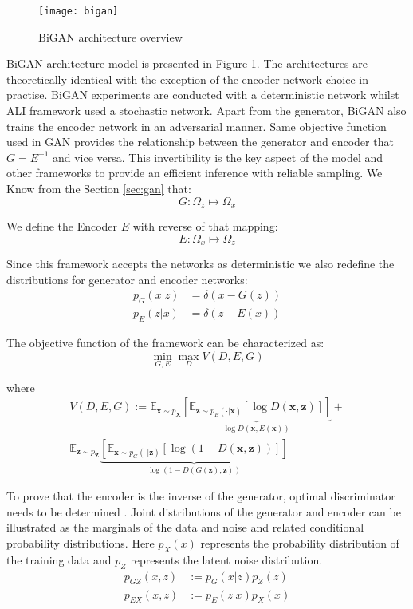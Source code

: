 \begin{figure}[h!]
	\centering
	\texttt{[image: bigan]}
    \caption{BiGAN architecture overview}
    \label{fig:bigan_model}
\end{figure}


BiGAN architecture model is presented in Figure \ref{fig:bigan_model}. The architectures are
theoretically identical with the exception of the encoder network choice in practise. BiGAN
experiments are conducted with a deterministic network whilst ALI framework used a stochastic
network. Apart from the generator, BiGAN also trains the encoder network in an adversarial manner.
Same objective function used in GAN provides the relationship between the generator and encoder that
$G = E^{-1}$ and vice versa. This invertibility is the key aspect of the model and other
frameworks to provide an efficient inference with reliable sampling. We Know from the Section
\ref{sec:gan} that: 
$$
G : \Omega_{z} \mapsto \Omega_{x}
$$

We define the Encoder $E$ with reverse of that mapping:
$$
E : \Omega_{x} \mapsto \Omega_{z}
$$

Since this framework accepts the networks as deterministic we also redefine the distributions for
generator and encoder networks:
\begin{align*}
    p_G(x | z) & = \delta (x - G(z)) \\
    p_E(z | x) & = \delta (z - E(x))
\end{align*}

The objective function of the framework can be characterized as:
\begin{equation}
    \min _{G, E} \max _{D} V(D, E, G)
\end{equation}
 
where
\begin{multline}
    \label{eqn:bigan_v}
V(D, E, G) :=\mathbb{E}_{\mathbf{x} \sim p_{\mathbf{X}}}  \underbrace{\left[ \mathbb{E}_{\mathbf{z} \sim p_{E}(\cdot | \mathbf{x})}[\log D(\mathbf{x}, \mathbf{z})] \right]}_{\log D(\mathbf{x}, E(\mathbf{x}))} + \\ \mathbb{E}_{\mathbf{z} \sim p_{\mathbf{Z}}} \underbrace{  \left[ \mathbb{E}_{\mathbf{x} \sim p_{G}(\cdot | \mathbf{z})}[\log (1-D(\mathbf{x}, \mathbf{z}))] \right]}_{\log (1-D(G(\mathbf{z}), \mathbf{z}))}
\end{multline}

To prove that the encoder is the inverse of the generator, optimal discriminator needs to be
determined \cite{Donahue2017AdversarialFL}. Joint distributions of the generator and encoder can
be illustrated as the marginals of the data and noise and related conditional probability
distributions. Here $p_{X}(x)$ represents the probability distribution of the training data and $p_{Z}$ 
represents the latent noise distribution.
\begin{align}
    \label{eqn:bigan_gz}
    p_{GZ} (x, z ) &:= p_G(x | z) p_{Z} (z) \\[5pt] 
    \label{eqn:bigan_ex}
    p_{EX} (x, z ) &:= p_E(z | x) p_{X} (x) 
\end{align}

